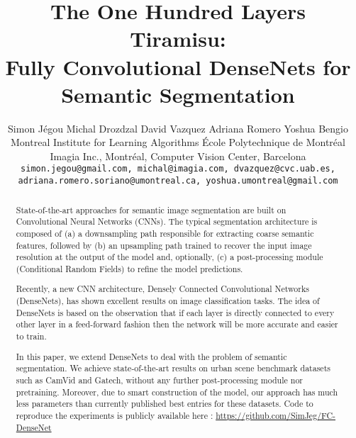 \documentclass[10pt,twocolumn,letterpaper]{article}
\begin{document}
\title{The One Hundred Layers Tiramisu: \\ Fully Convolutional DenseNets for Semantic Segmentation}

\author{Simon J\'{e}gou Michal Drozdzal David Vazquez Adriana Romero Yoshua Bengio\\
Montreal Institute for Learning Algorithms \'{E}cole Polytechnique de Montr\'{e}al \\ Imagia Inc., Montr\'{e}al, Computer Vision Center, Barcelona \\
{\tt\small simon.jegou@gmail.com, michal@imagia.com, dvazquez@cvc.uab.es,} \\ {\tt \small adriana.romero.soriano@umontreal.ca, yoshua.umontreal@gmail.com}
}

\maketitle


\begin{abstract}
State-of-the-art approaches for semantic image segmentation are built on Convolutional Neural Networks (CNNs). The typical segmentation architecture is composed of (a) a downsampling path responsible for extracting coarse semantic features, followed by (b) an upsampling path trained to recover the input image resolution at the output of the model and, optionally, (c) a post-processing module (\eg Conditional Random Fields) to refine the model predictions. 

Recently, a new CNN architecture, Densely Connected Convolutional Networks (DenseNets), has shown excellent results on image classification tasks. The idea of DenseNets is based on the observation that if each layer is directly connected to every other layer in a feed-forward fashion then the network will be more accurate and easier to train.  

In this paper, we extend DenseNets to deal with the problem of semantic segmentation. We achieve state-of-the-art results on urban scene benchmark datasets such as CamVid and Gatech, without any further post-processing module nor pretraining. Moreover, due to smart construction of the model, our approach has much less parameters than currently published best entries for these datasets. Code to reproduce the experiments is publicly available here : \url{https://github.com/SimJeg/FC-DenseNet}

\end{abstract}
\end{document}
